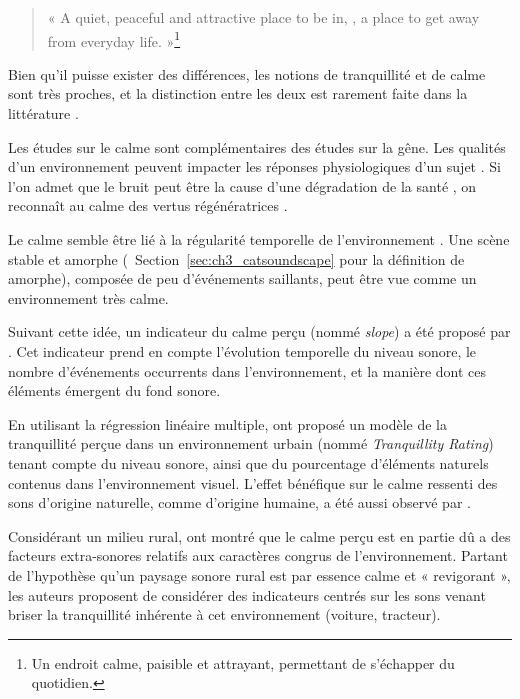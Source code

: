 \begin{quote}
« A quiet, peaceful and attractive place to be in, \ie, a place to get away from everyday life. »\footnote{Un endroit calme, paisible et attrayant, permettant de s'échapper du quotidien.}
\end{quote}

Bien qu'il puisse exister des différences, les notions de tranquillité et de calme sont très proches, et la distinction entre les deux est rarement faite dans la littérature \citep{delaitre2012definition}. 

Les études sur le calme sont complémentaires des études sur la gêne. Les qualités d'un environnement peuvent impacter les réponses physiologiques d'un sujet \citep{hume2013physiological}. Si l'on admet que le bruit peut être la cause d'une dégradation de la santé \citep{stansfeld2005aircraft}, on reconnaît au calme des vertus régénératrices \citep{payne2013production,de2006quiet}.

Le calme semble être lié à la régularité temporelle de l'environnement \citep{delaitre2012definition}. Une scène stable et amorphe (\cf~Section~\ref{sec:ch3_catsoundscape} pour la définition de amorphe), composée de peu d'événements saillants, peut être vue comme un environnement très calme. 

Suivant cette idée, un indicateur du calme perçu (nommé \emph{slope}) a été proposé par \citep{memoli2008soundscape}. Cet indicateur prend en compte l'évolution temporelle du niveau sonore, le nombre d'événements occurrents dans l'environnement, et la manière dont ces éléments émergent du fond sonore. 

En utilisant la régression linéaire multiple, \citep{pheasant2008acoustic,pheasant2009validation} ont proposé un modèle de la tranquillité perçue dans un environnement urbain (nommé \emph{Tranquillity Rating}) tenant compte du niveau sonore, ainsi que du pourcentage d'éléments naturels contenus dans l'environnement visuel. L'effet bénéfique sur le calme ressenti des sons d'origine naturelle, comme d'origine humaine, a été aussi observé par \citep{de2013characterizing}.

Considérant un milieu rural, \citep{de2006quiet} ont montré que le calme perçu est en partie dû a des facteurs extra-sonores relatifs aux caractères congrus de l'environnement. Partant de l'hypothèse qu'un paysage sonore rural est par essence calme et « revigorant », les auteurs proposent de considérer des indicateurs centrés sur les sons venant briser la tranquillité inhérente à cet environnement (voiture, tracteur).

